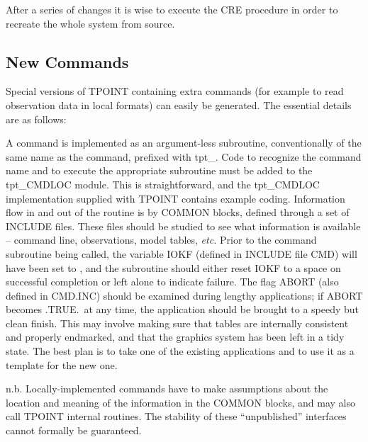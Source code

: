 After a series of changes it is wise to execute the CRE
procedure in order to recreate the whole system from source.

\subsection{New Commands}
Special versions of TPOINT containing extra commands (for example
to read observation data in local formats) can easily be generated.
The essential details are as follows:

A command is implemented as an argument-less subroutine,
conventionally of the same name as the command, prefixed with
tpt\_.  Code to recognize
the command name and to execute the appropriate subroutine must be
added to the tpt\_CMDLOC module.  This is straightforward, and the
tpt\_CMDLOC implementation supplied with TPOINT contains example coding.
Information flow in and out of the routine is by COMMON blocks,
defined through a set of INCLUDE files.  These files should be
studied to see what information is available -- command line,
observations, model tables, {\it etc.}  Prior to the command subroutine
being called, the variable IOKF (defined in INCLUDE file CMD)
will have been set to , and the subroutine should either reset
IOKF to a space on successful completion or left alone to indicate
failure.  The flag ABORT (also defined in CMD.INC) should be
examined during lengthy applications;  if ABORT becomes .TRUE.\ at
any time, the application should be brought to a speedy but clean
finish.  This may involve making sure that tables are internally
consistent and properly endmarked, and that the graphics system
has been left in a tidy state.  The best plan is to take one of
the existing applications and to use it as a template for the new
one.

n.b.  Locally-implemented commands have to make assumptions about
the location and meaning of the information in the COMMON blocks,
and may also call TPOINT internal routines.  The stability of
these ``unpublished'' interfaces cannot formally be guaranteed.

